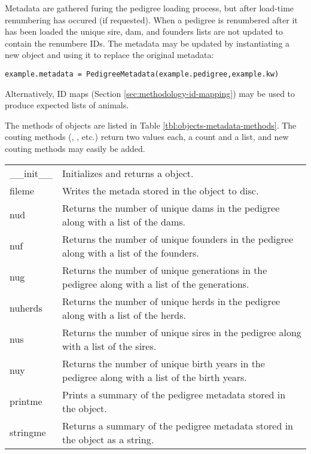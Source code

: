 Metadata are gathered furing the pedigree loading process, but after load-time renumbering has occured (if requested). When a pedigree is renumbered after it has been loaded the unique sire, dam, and founders lists are not updated to contain the renumbere IDs. The metadata may be updated by instantiating a new  object and using it to replace the original metadata:
\begin{verbatim}
example.metadata = PedigreeMetadata(example.pedigree,example.kw)
\end{verbatim}
Alternatively, ID maps (Section \ref{sec:methodology-id-mapping}) may be used to produce expected lists of animals.

The methods of  objects are listed in Table \ref{tbl:objects-metadata-methods}. The couting methods (, , etc.) return two values each, a count and a list, and new couting methods may easily be added.
\begin{center}
    \tablelasttail{\hline}
    \label{tbl:objects-metadata-methods}
    \begin{xtabular}{l|p{4in}}
        \_\_init\_\_ & Initializes and returns a  object. \\
        fileme & Writes the metada stored in the  object to disc. \\
        nud & Returns the number of unique dams in the pedigree along with a list of the dams. \\
        nuf & Returns the number of unique founders in the pedigree along with a list of the founders. \\
        nug & Returns the number of unique generations in the pedigree along with a list of the generations. \\
        nuherds & Returns the number of unique herds in the pedigree along with a list of the herds. \\
        nus & Returns the number of unique sires in the pedigree along with a list of the sires. \\
        nuy & Returns the number of unique birth years in the pedigree along with a list of the birth years. \\
        printme & Prints a summary of the pedigree metadata stored in the  object. \\
        stringme & Returns a summary of the pedigree metadata stored in the  object as a string. \\
    \end{xtabular}
\end{center}
